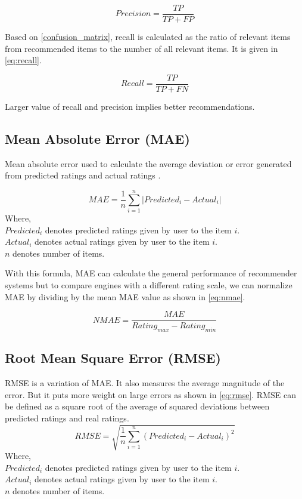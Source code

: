 \begin{equation}
Precision = \frac{TP}{TP + FP} 
\label{eq:precision}
\end{equation}

\noindent Based on \autoref{confusion_matrix}, recall is calculated as the ratio of relevant items from recommended items to the number of all relevant items. It is given in \autoref{eq:recall}. 

\begin{equation}
Recall = \frac{TP}{TP + FN} 
\label{eq:recall}
\end{equation}

Larger value of recall and precision implies better recommendations.



\subsection{Mean Absolute Error (MAE)}
Mean absolute error used to calculate the average deviation or error generated from predicted ratings and actual ratings \cite{26}.

\begin{equation}
MAE = \frac{1}{n} \sum_{i=1}^{n}{\vert{Predicted_i - Actual_i} \vert}
\label{eq:mae}
\end{equation}
\noindent Where, \\ 
$Predicted_i$ \textsf{ denotes predicted ratings given by user to the item} $i.$ \\
$Actual_i$ \textsf{ denotes actual ratings given by user to the item } $i.$ \\
$n$ \textsf{denotes number of items.}

\noindent With this formula, MAE can calculate the general performance of recommender systems but to compare engines with a different rating scale, we can normalize MAE by dividing by the mean MAE value as shown in \autoref{eq:nmae}. 

\begin{equation}
NMAE = \frac{MAE} {Rating_{max} - Rating_{min}}
\label{eq:nmae}
\end{equation}


\subsection{Root Mean Square Error (RMSE)}
RMSE is a variation of MAE. It also measures the average magnitude of the error. But it puts more weight on large errors as shown in \autoref{eq:rmse}. RMSE can be defined as a square root of the average of squared deviations between predicted ratings and real ratings.
\begin{equation}
RMSE = \sqrt{ \frac{1}{n} \sum_{i=1}^{n}{({Predicted_i - Actual_i} ) ^ {2}}}
\label{eq:rmse}
\end{equation}
\noindent Where, \\
$Predicted_i$ \textsf{ denotes predicted ratings given by user to the item} $i.$ \\
$Actual_i$ \textsf{ denotes actual ratings given by user to the item } $i.$ \\
$n$ \textsf{denotes number of items.}

